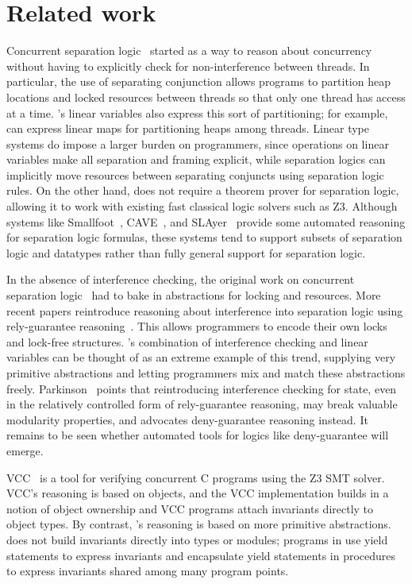 \section{Related work}

Concurrent separation logic~\cite{OHearn07} started as a way to reason about concurrency without having to explicitly check for non-interference between threads.
In particular, the use of separating conjunction allows programs to partition heap locations and locked resources between threads so that only one thread has access at a time.
\civl's linear variables also express this sort of partitioning; for example, \civl can express linear maps for partitioning heaps among threads.
Linear type systems do impose a larger burden on programmers, since operations on linear variables make all separation and framing explicit, while separation logics can implicitly move resources between separating conjuncts using separation logic rules.
On the other hand, \civl does not require a theorem prover for separation logic, allowing it to work with existing fast classical logic solvers such as Z3.
Although systems like Smallfoot~\cite{Smallfoot}, CAVE~\cite{Cave}, and SLAyer~\cite{Slayer} provide some automated reasoning for separation logic formulas, these systems tend to support subsets of separation logic and datatypes rather than fully general support for separation logic.

In the absence of interference checking, the original work on concurrent separation logic~\cite{OHearn07} had to bake in abstractions for locking and resources.
More recent papers reintroduce reasoning about interference into separation logic using rely-guarantee reasoning~\cite{SAGL,RGSep}.
This allows programmers to encode their own locks and lock-free structures.
\civl's combination of interference checking and linear variables can be thought of as an extreme example of this trend, supplying very primitive abstractions and letting programmers mix and match these abstractions freely.
Parkinson~\cite{SepLog700} points that reintroducing interference checking for state, even in the relatively controlled form of rely-guarantee reasoning, may break valuable modularity properties, and advocates deny-guarantee reasoning instead.
It remains to be seen whether automated tools for logics like deny-guarantee will emerge.

VCC~\cite{VCC} is a tool for verifying concurrent C programs using the Z3 SMT solver.  VCC's reasoning is based on objects, and the VCC implementation builds in a notion of object ownership and VCC programs attach invariants directly to object types.  By contrast, \civl's reasoning is based on more primitive abstractions.  \civl does not build invariants directly into types or modules; programs in \civl use yield statements to express invariants and encapsulate yield statements in procedures to express invariants shared among many program points.

